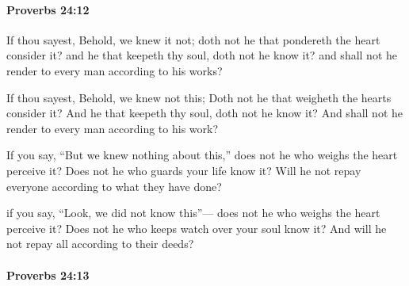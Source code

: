 		\paragraph{Proverbs 24:12} %
			\label{PROVERBS-24-12}

			If thou sayest, Behold, we knew it not; doth not he that pondereth the heart consider it? and he that keepeth thy soul, doth not he know it? and shall not he render to every man according to his works?

			\begin{versebox}
					\item[BHS] 
					\item[ASV] If thou sayest, Behold, we knew not this; Doth not he that weigheth the hearts consider it? And he that keepeth thy soul, doth not he know it? And shall not he render to every man according to his work?
					\item[NIV] If you say, “But we knew nothing about this,” does not he who weighs the heart perceive it? Does not he who guards your life know it? Will he not repay everyone according to what they have done?
					\item[NRSV] if you say, “Look, we did not know this”— does not he who weighs the heart perceive it? Does not he who keeps watch over your soul know it? And will he not repay all according to their deeds?
			\end{versebox}

		\paragraph{Proverbs 24:13} %
			\label{PROVERBS-24-13}

